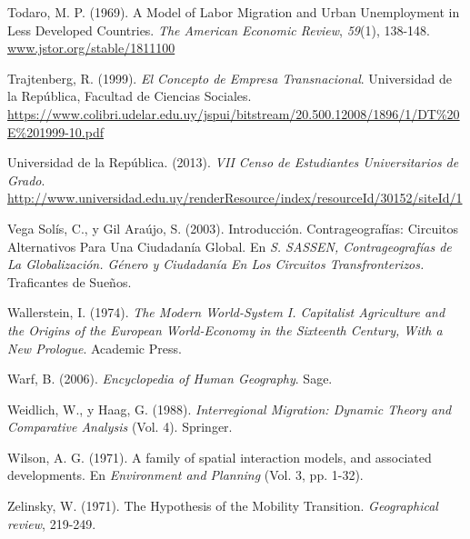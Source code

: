 \documentclass[12pt,spanish,]{article}
\begin{document}
\leavevmode\hypertarget{ref-todaro1969}{}%
Todaro, M. P. (1969). A Model of Labor Migration and Urban Unemployment
in Less Developed Countries. \emph{The American Economic Review},
\emph{59}(1), 138-148. \url{www.jstor.org/stable/1811100}

\leavevmode\hypertarget{ref-trajtenberg1999}{}%
Trajtenberg, R. (1999). \emph{El Concepto de Empresa Transnacional}.
Universidad de la República, Facultad de Ciencias Sociales.
\url{https://www.colibri.udelar.edu.uy/jspui/bitstream/20.500.12008/1896/1/DT\%20E\%201999-10.pdf}

\leavevmode\hypertarget{ref-universidaddelarepublica2013}{}%
Universidad de la República. (2013). \emph{VII Censo de Estudiantes
Universitarios de Grado}.
\url{http://www.universidad.edu.uy/renderResource/index/resourceId/30152/siteId/1}

\leavevmode\hypertarget{ref-vegasolis2003}{}%
Vega Solís, C., y Gil Araújo, S. (2003). Introducción. Contrageografías:
Circuitos Alternativos Para Una Ciudadanía Global. En \emph{S. SASSEN,
Contrageografías de La Globalización. Género y Ciudadanía En Los
Circuitos Transfronterizos.} Traficantes de Sueños.

\leavevmode\hypertarget{ref-wallerstein1974}{}%
Wallerstein, I. (1974). \emph{The Modern World-System I. Capitalist
Agriculture and the Origins of the European World-Economy in the
Sixteenth Century, With a New Prologue}. Academic Press.

\leavevmode\hypertarget{ref-warf2006}{}%
Warf, B. (2006). \emph{Encyclopedia of Human Geography}. Sage.

\leavevmode\hypertarget{ref-weidlich1988}{}%
Weidlich, W., y Haag, G. (1988). \emph{Interregional Migration: Dynamic
Theory and Comparative Analysis} (Vol. 4). Springer.

\leavevmode\hypertarget{ref-wilson1971}{}%
Wilson, A. G. (1971). A family of spatial interaction models, and
associated developments. En \emph{Environment and Planning} (Vol. 3, pp.
1-32).

\leavevmode\hypertarget{ref-zelinsky1971}{}%
Zelinsky, W. (1971). The Hypothesis of the Mobility Transition.
\emph{Geographical review}, 219-249.
\end{document}

